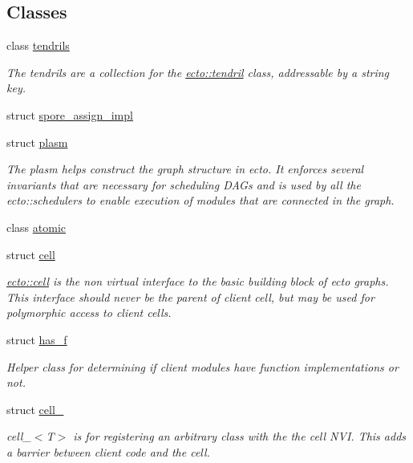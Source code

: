 \subsection*{Classes}
\begin{DoxyCompactItemize}
\item 
class \hyperlink{classecto_1_1tendrils}{tendrils}
\begin{DoxyCompactList}\small\item\em The tendrils are a collection for the \hyperlink{classecto_1_1tendril}{ecto\-::tendril} class, addressable by a string key. \end{DoxyCompactList}\item 
struct \hyperlink{structecto_1_1spore__assign__impl}{spore\-\_\-assign\-\_\-impl}
\item 
struct \hyperlink{structecto_1_1plasm}{plasm}
\begin{DoxyCompactList}\small\item\em The plasm helps construct the graph structure in ecto. It enforces several invariants that are necessary for scheduling D\-A\-Gs and is used by all the ecto\-::schedulers to enable execution of modules that are connected in the graph. \end{DoxyCompactList}\item 
class \hyperlink{classecto_1_1atomic}{atomic}
\item 
struct \hyperlink{structecto_1_1cell}{cell}
\begin{DoxyCompactList}\small\item\em \hyperlink{structecto_1_1cell}{ecto\-::cell} is the non virtual interface to the basic building block of ecto graphs. This interface should never be the parent of client cell, but may be used for polymorphic access to client cells. \end{DoxyCompactList}\item 
struct \hyperlink{structecto_1_1has__f}{has\-\_\-f}
\begin{DoxyCompactList}\small\item\em Helper class for determining if client modules have function implementations or not. \end{DoxyCompactList}\item 
struct \hyperlink{structecto_1_1cell__}{cell\-\_\-}
\begin{DoxyCompactList}\small\item\em cell\-\_\-$<$\-T$>$ is for registering an arbitrary class with the the cell N\-V\-I. This adds a barrier between client code and the cell. \end{DoxyCompactList}\item 

\end{DoxyCompactItemize}
